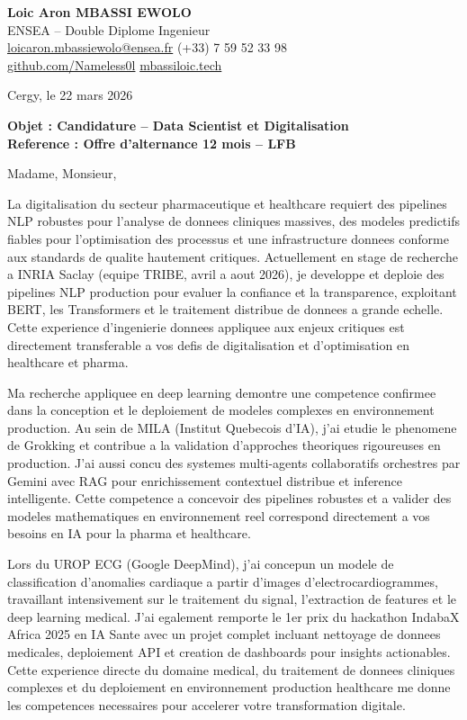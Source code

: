 \documentclass[a4paper,11pt]{article}
\begin{document}
\noindent
\textbf{Loic Aron MBASSI EWOLO} \\
ENSEA -- Double Diplome Ingenieur \\
\href{mailto:loicaron.mbassiewolo@ensea.fr}{loicaron.mbassiewolo@ensea.fr} \quad (+33) 7 59 52 33 98 \\
\href{https://github.com/Nameless0l}{github.com/Nameless0l} \quad \href{https://mbassiloic.tech}{mbassiloic.tech}

\vspace{1em}
\noindent
Cergy, le 22 mars 2026

\vspace{1em}
\noindent
\textbf{Objet : Candidature -- Data Scientist et Digitalisation} \\
\textbf{Reference : Offre d'alternance 12 mois -- LFB}

\vspace{1.5em}
\noindent Madame, Monsieur,

La digitalisation du secteur pharmaceutique et healthcare requiert des pipelines NLP robustes pour l'analyse de donnees cliniques massives, des modeles predictifs fiables pour l'optimisation des processus et une infrastructure donnees conforme aux standards de qualite hautement critiques. Actuellement en stage de recherche a INRIA Saclay (equipe TRIBE, avril a aout 2026), je developpe et deploie des pipelines NLP production pour evaluer la confiance et la transparence, exploitant BERT, les Transformers et le traitement distribue de donnees a grande echelle. Cette experience d'ingenierie donnees appliquee aux enjeux critiques est directement transferable a vos defis de digitalisation et d'optimisation en healthcare et pharma.

Ma recherche appliquee en deep learning demontre une competence confirmee dans la conception et le deploiement de modeles complexes en environnement production. Au sein de MILA (Institut Quebecois d'IA), j'ai etudie le phenomene de Grokking et contribue a la validation d'approches theoriques rigoureuses en production. J'ai aussi concu des systemes multi-agents collaboratifs orchestres par Gemini avec RAG pour enrichissement contextuel distribue et inference intelligente. Cette competence a concevoir des pipelines robustes et a valider des modeles mathematiques en environnement reel correspond directement a vos besoins en IA pour la pharma et healthcare.

Lors du UROP ECG (Google DeepMind), j'ai concepun un modele de classification d'anomalies cardiaque a partir d'images d'electrocardiogrammes, travaillant intensivement sur le traitement du signal, l'extraction de features et le deep learning medical. J'ai egalement remporte le 1er prix du hackathon IndabaX Africa 2025 en IA Sante avec un projet complet incluant nettoyage de donnees medicales, deploiement API et creation de dashboards pour insights actionables. Cette experience directe du domaine medical, du traitement de donnees cliniques complexes et du deploiement en environnement production healthcare me donne les competences necessaires pour accelerer votre transformation digitale.
\end{document}
